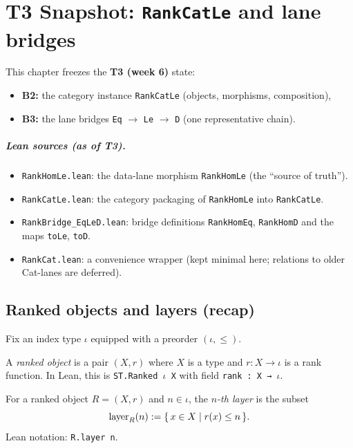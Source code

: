\chapter{T3 Snapshot: \texttt{RankCatLe} and lane bridges}
\label{ch:t3-rankcatle}

This chapter freezes the \textbf{T3 (week 6)} state:
\begin{itemize}
\item \textbf{B2:} the category instance \texttt{RankCatLe} (objects, morphisms, composition),
\item \textbf{B3:} the lane bridges \texttt{Eq} $\to$ \texttt{Le} $\to$ \texttt{D} (one representative chain).
\end{itemize}

\paragraph{Lean sources (as of T3).}
\begin{itemize}
\item \texttt{RankHomLe.lean}: the data-lane morphism \texttt{RankHomLe} (the ``source of truth''). 
\item \texttt{RankCatLe.lean}: the category packaging of \texttt{RankHomLe} into \texttt{RankCatLe}.
\item \texttt{RankBridge\_EqLeD.lean}: bridge definitions \texttt{RankHomEq}, \texttt{RankHomD} and the maps
  \texttt{toLe}, \texttt{toD}.
\item \texttt{RankCat.lean}: a convenience wrapper (kept minimal here; relations to older Cat-lanes are deferred).
\end{itemize}

\section{Ranked objects and layers (recap)}
Fix an index type $\iota$ equipped with a preorder $(\iota,\le)$.

\begin{definition}
A \emph{ranked object} is a pair $(X,r)$ where $X$ is a type and $r : X \to \iota$ is a rank function.
In Lean, this is \texttt{ST.Ranked $\iota$ X} with field \texttt{rank : X → $\iota$}.
\end{definition}

\begin{definition}[Layers]
For a ranked object $R=(X,r)$ and $n\in\iota$, the \emph{$n$-th layer} is the subset
\[
  \operatorname{layer}_R(n) := \{\,x\in X \mid r(x)\le n\,\}.
\]
Lean notation: \texttt{R.layer n}.
\end{definition}

